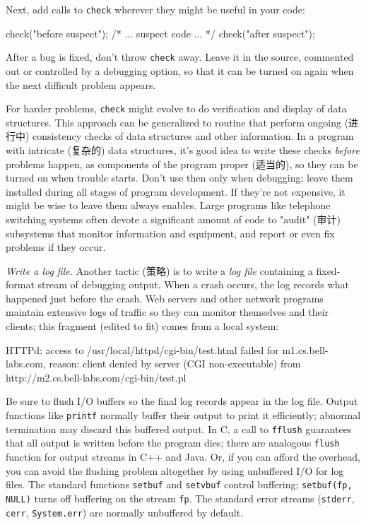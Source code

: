 Next, add calls to \verb'check' wherever they might be useful in your code:
\begin{wellcode}
    check("before suspect");
    /* ... suspect code ... */
    check("after suspect");
\end{wellcode}

After a bug is fixed, don't throw \verb'check' away. Leave it in the
source, commented out or controlled by a debugging option, so that it can
be turned on again when the next difficult problem appears.

For harder problems, \verb'check' might evolve to do verification and
display of data structures. This approach can be generalized to routine
that perform ongoing (进行中) consistency checks of data structures and
other information. In a program with intricate (复杂的) data structures,
it's good idea to write these checks \emph{before} problems happen, as
components of the program proper (适当的), so they can be turned on when
trouble starts. Don't use then only when debugging; leave them installed
during all stages of program development. If they're not expensive, it
might be wise to leave them always enables. Large programs like telephone
switching systems often devote a significant amount of code to "audit"
(审计) subsystems that monitor information and equipment, and report or
even fix problems if they occur.

\emph{Write a log file.} Another tactic (策略) is to write a \emph{log
    file} containing a fixed-format stream of debugging output. When a
crash occurs, the log records what happened just before the crash. Web
servers and other network programs maintain extensive logs of traffic so
they can monitor themselves and their clients; this fragment (edited to
fit) comes from a local system:
\begin{wellcode}
    HTTPd: access to /usr/local/httpd/cgi-bin/test.html
        failed for m1.cs.bell-labs.com,
        reason: client denied by server (CGI non-executable)
        from http://m2.cs.bell-labs.com/cgi-bin/test.pl
\end{wellcode}

Be sure to flush I/O buffers so the final log records appear in the log
file. Output functions like \verb'printf' normally buffer their output to
print it efficiently; abnormal termination may discard this buffered
output. In C, a call to \verb'fflush' guarantees that all output is written
before the program dies; there are analogous \verb'flush' function for
output streams in C++ and Java. Or, if you can afford the overhead, you can
avoid the flushing problem altogether by using unbuffered I/O for log
files. The standard functions \verb'setbuf' and \verb'setvbuf' control
buffering; \verb'setbuf(fp, NULL)' turns off buffering on the stream
\verb'fp'. The standard error streams (\verb'stderr', \verb'cerr',
\verb'System.err') are normally unbuffered by default.

